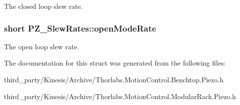 The closed loop slew rate. 

\subsubsection[{\texorpdfstring{open\+Mode\+Rate}{openModeRate}}]{\setlength{\rightskip}{0pt plus 5cm}short P\+Z\+\_\+\+Slew\+Rates\+::open\+Mode\+Rate}\hypertarget{struct_p_z___slew_rates_a1fc3ac86dba74540fc1ba16ae0b3daba}{}\label{struct_p_z___slew_rates_a1fc3ac86dba74540fc1ba16ae0b3daba}


The open loop slew rate. 



The documentation for this struct was generated from the following files\+:\begin{DoxyCompactItemize}
\item 
third\+\_\+party/\+Kinesis/\+Archive/Thorlabs.\+Motion\+Control.\+Benchtop.\+Piezo.\+h\item 
third\+\_\+party/\+Kinesis/\+Archive/Thorlabs.\+Motion\+Control.\+Modular\+Rack.\+Piezo.\+h\end{DoxyCompactItemize}
